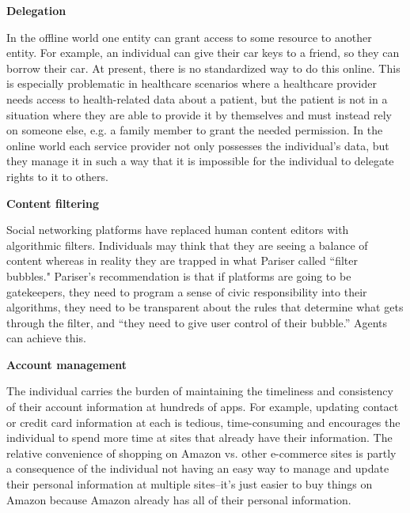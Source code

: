 \documentclass[11pt, oneside]{article}   	%
\begin{document}
\textbf{Delegation}

In the offline world one entity can grant access to some resource to another entity. For example, an individual can give their car keys to a friend, so they can borrow their car. At present, there is no standardized way to do this online. This is especially problematic in healthcare scenarios where a healthcare provider needs access to health-related data about a patient, but the patient is not in a situation where they are able to provide it by themselves and must instead rely on someone else, e.g. a family member to grant the needed permission. In the online world each service provider not only possesses the individual's data, but they manage it in such a way that it is impossible for the individual to delegate rights to it to others. 

\textbf{Content filtering}

Social networking platforms have replaced human content editors with algorithmic filters. Individuals may think that they are seeing a balance of content whereas in reality they are trapped in what Pariser called ``filter bubbles."\cite{Pariser2011} Pariser's recommendation is that if platforms are going to be gatekeepers, they need to program a sense of civic responsibility into their algorithms, they need to be transparent about the rules that determine what gets through the filter, and ``they need to give user control of their bubble.''\cite[p66]{McNamee2020} Agents can achieve this.

\textbf{Account management} 

The individual carries the burden of maintaining the timeliness and consistency of their account information at hundreds of apps. For example, updating contact or credit card information at each is tedious, time-consuming and encourages the individual to spend more time at sites that already have their information. The relative convenience of shopping on Amazon vs. other e-commerce sites is partly a consequence of the individual not having an easy way to manage and update their personal information at multiple sites--it's just easier to buy things on Amazon because Amazon already has all of their personal information.

\end{document}
